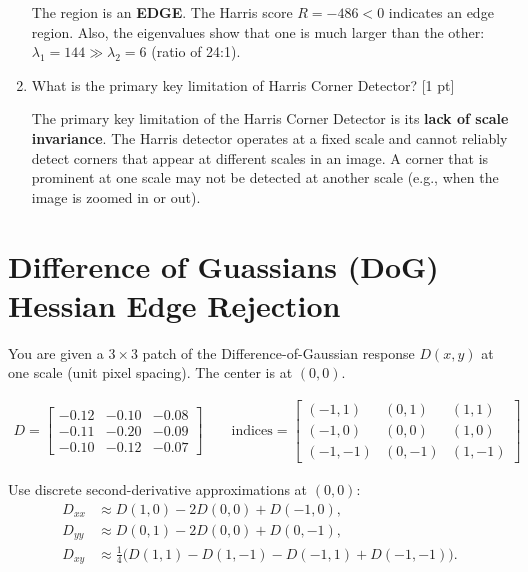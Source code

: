 \documentclass[12pt,a4paper]{article}
\begin{document}
\begin{enumerate}
The region is an \textbf{EDGE}. The Harris score $R = -486 < 0$ indicates an edge region. Also, the eigenvalues show that one is much larger than the other: $\lambda_1 = 144 \gg \lambda_2 = 6$ 
(ratio of 24:1).

    \item What is the primary key limitation of Harris Corner Detector? [1 pt]

    The primary key limitation of the Harris Corner Detector is its \textbf{lack of scale invariance}.
The Harris detector operates at a fixed scale and cannot reliably detect corners that appear at different scales in an image. A corner that is prominent at one 
scale may not be detected at another scale (e.g., when the image is zoomed in or out).
\end{enumerate}

\section{Difference of Guassians (DoG) Hessian Edge Rejection}
You are given a $3\times 3$ patch of the Difference-of-Gaussian response $D(x,y)$ at one scale (unit pixel spacing). The center is at $(0,0)$.

\begin{align*}
D=\begin{bmatrix}
-0.12 & -0.10 & -0.08\\
-0.11 & -0.20 & -0.09\\
-0.10 & -0.12 & -0.07
\end{bmatrix}
\qquad
\text{indices}=
\begin{bmatrix}
(-1,1) & (0,1) & (1,1)\\
(-1,0) & (0,0) & (1,0)\\
(-1,-1) & (0,-1) & (1,-1)
\end{bmatrix}
\end{align*}

Use discrete second-derivative approximations at $(0,0)$:
\begin{align*}
D_{xx} &\approx D(1,0)-2D(0,0)+D(-1,0),\\
D_{yy} &\approx D(0,1)-2D(0,0)+D(0,-1),\\
D_{xy} &\approx \tfrac{1}{4}\big(D(1,1)-D(1,-1)-D(-1,1)+D(-1,-1)\big).
\end{align*}
\end{document}
